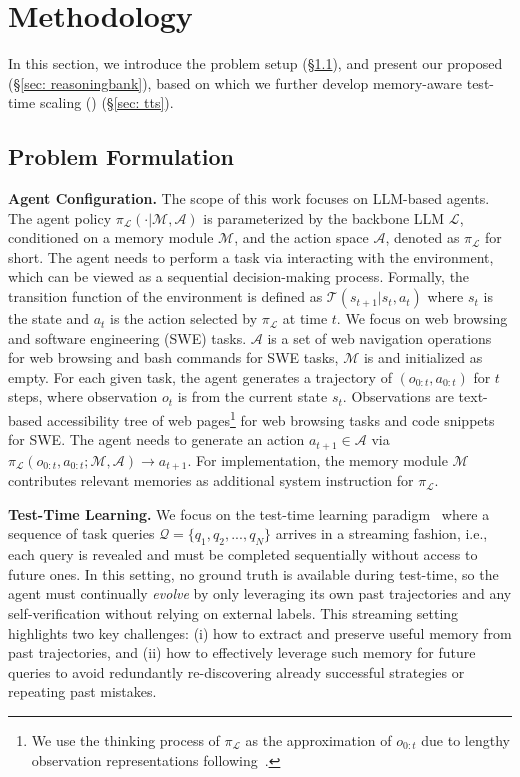 \section{Methodology}\label{sec: method}

In this section, we introduce the problem setup (\S\ref{sec: prob_form}), and present our proposed \ours{} (\S\ref{sec: reasoningbank}), based on which we further develop memory-aware test-time scaling (\mats{}) (\S\ref{sec: tts}).



\subsection{Problem Formulation}\label{sec: prob_form}

\noindent\textbf{Agent Configuration.} The scope of this work focuses on LLM-based agents. The agent policy $\pi_{\mathcal{L}}(\cdot|\mathcal{M}, \mathcal{A})$ is parameterized by the backbone LLM $\mathcal{L}$, conditioned on a memory module $\mathcal{M}$, and the action space $\mathcal{A}$, denoted as $\pi_{\mathcal{L}}$ for short. The agent needs to perform a task via interacting with the environment, which can be viewed as a sequential decision-making process. Formally, the transition function of the environment is defined as $\mathcal{T}(s_{t+1}|s_t, a_t)$ where $s_t$ is the state and $a_t$ is the action selected by $\pi_{\mathcal{L}}$ at time $t$. 
We focus on web browsing and software engineering (SWE) tasks.
$\mathcal{A}$ is a set of web navigation operations for web browsing and bash commands for SWE tasks, $\mathcal{M}$ is \ours{} and initialized as empty. For each given task, the agent generates a trajectory of $(o_{0:t}, a_{0:t})$ for $t$ steps, where observation $o_t$ is from the current state $s_t$. Observations are text-based accessibility tree of web pages\footnote{We use the thinking process of $\pi_{\mathcal{L}}$ as the approximation of $o_{0:t}$ due to lengthy observation representations following~\cite{wang2025agent}.} for web browsing tasks and code snippets for SWE. The agent needs to generate an action $a_{t+1}\in\mathcal{A}$ via $\pi_{\mathcal{L}}(o_{0:t}, a_{0:t};\mathcal{M},\mathcal{A})\rightarrow a_{t+1}$.
For implementation, the memory module $\mathcal{M}$ contributes relevant memories as additional system instruction for $\pi_{\mathcal{L}}$.

\noindent\textbf{Test-Time Learning.} We focus on the test-time learning paradigm~\citep{wu2024streambench, wang2025inducing} where a sequence of task queries $\mathcal{Q}=\{q_1, q_2, ...,q_N\}$ arrives in a streaming fashion, i.e., each query is revealed and must be completed sequentially without access to future ones. 
In this setting, no ground truth is available during test-time, so the agent must continually \textit{evolve} by only leveraging its own past trajectories and any self-verification without relying on external labels. 
This streaming setting highlights two key challenges: (i) how to extract and preserve useful memory from past trajectories, and (ii) how to effectively leverage such memory for future queries to avoid redundantly re-discovering already successful strategies or repeating past mistakes. 



